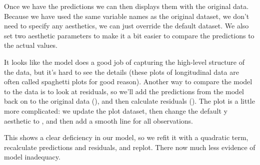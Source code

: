 Once we have the predictions we can then displays them with the original data.  Because we have used the same variable names as the original  dataset, we don't need to specify any aesthetics, we can just override the default dataset.  We also set two aesthetic parameters to make it a bit easier to compare the predictions to the actual values.

% 


It looks like the model does a good job of capturing the high-level structure of the data, but it's hard to see the details (these plots of longitudinal data are often called spaghetti plots for good reason).  Another way to compare the model to the data is to look at residuals, so we'll add the predictions from the model back on to the original data (), and then calculate residuals ().  The plot is a little more complicated: we update the plot dataset, then change the default y aesthetic to , and then add a smooth line for all observations.

% 
% 


This shows a clear deficiency in our model, so we refit it with a quadratic term, recalculate predictions and residuals, and replot.  There now much less evidence of model inadequacy.

% 
% 





